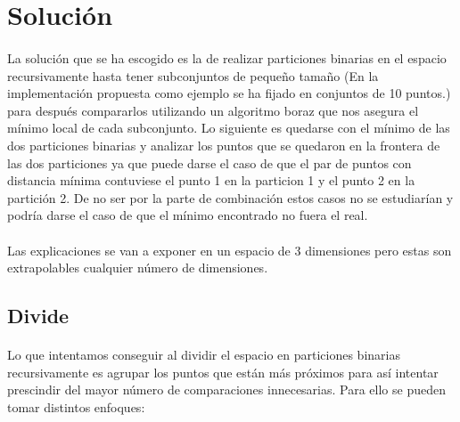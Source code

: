 \documentclass{article}
\begin{document}
\section{Solución}

	\paragraph{}
	La solución que se ha escogido es la de realizar particiones binarias en el espacio recursivamente hasta tener subconjuntos de pequeño tamaño (En la implementación propuesta como ejemplo se ha fijado en conjuntos de 10 puntos.) para después compararlos utilizando un algoritmo boraz que nos asegura el mínimo local de cada subconjunto. Lo siguiente es quedarse con el mínimo de las dos particiones binarias y analizar los puntos que se quedaron en la frontera de las dos particiones ya que puede darse el caso de que el par de puntos con distancia mínima contuviese el punto 1 en la particion 1 y el punto 2 en la partición 2. De no ser por la parte de combinación estos casos no se estudiarían y podría darse el caso de que el mínimo encontrado no fuera el real.

	\paragraph{}
	Las explicaciones se van a exponer en un espacio de 3 dimensiones pero estas son extrapolables cualquier número de dimensiones.

	\subsection{Divide}
		\paragraph{}
		Lo que intentamos conseguir al dividir el espacio en particiones binarias recursivamente es agrupar los puntos que están más próximos para así intentar prescindir del mayor número de comparaciones innecesarias. Para ello se pueden tomar distintos enfoques:
		
\end{document}
